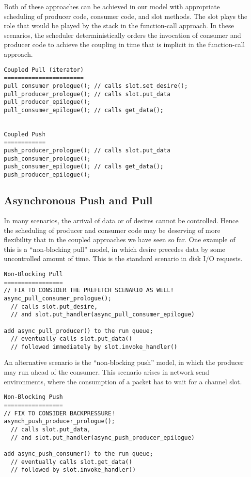 \documentclass[dvips,10pt]{article}
\begin{document}
Both of these approaches can be achieved in our model with appropriate
scheduling of producer code, consumer code, and slot methods.  The
slot plays the role that would be played by the stack in the
function-call approach.  In these scenarios, the scheduler
deterministically orders the invocation of consumer and producer code
to achieve the coupling in time that is implicit in the function-call
approach.

\begin{verbatim}
Coupled Pull (iterator)
=======================
pull_consumer_prologue(); // calls slot.set_desire();
pull_producer_prologue(); // calls slot.put_data
pull_producer_epilogue();
pull_consumer_epilogue(); // calls get_data();


Coupled Push
============
push_producer_prologue(); // calls slot.put_data
push_consumer_prologue(); 
push_consumer_epilogue(); // calls get_data();
push_producer_epilogue();
\end{verbatim}

\subsection{Asynchronous Push and Pull}
In many scenarios, the arrival of data or of desires cannot be
controlled.  Hence the scheduling of producer and consumer code may be
deserving of more flexibility that in the coupled approaches we have
seen so far.  One example of this is a ``non-blocking pull'' model, in
which desire precedes data by some uncontrolled amount of time.  This
is the standard scenario in disk I/O requests.

\begin{verbatim}
Non-Blocking Pull
=================
// FIX TO CONSIDER THE PREFETCH SCENARIO AS WELL!
async_pull_consumer_prologue(); 
  // calls slot.put_desire, 
  // and slot.put_handler(async_pull_consumer_epilogue)

add async_pull_producer() to the run queue; 
  // eventually calls slot.put_data()
  // followed immediately by slot.invoke_handler()
\end{verbatim}

An alternative scenario is the ``non-blocking push'' model, in which
the producer may run ahead of the consumer.  This scenario arises in
network send environments, where the consumption of a packet has to
wait for a channel slot.

\begin{verbatim}
Non-Blocking Push
=================
// FIX TO CONSIDER BACKPRESSURE!
asynch_push_producer_prologue();
  // calls slot.put_data, 
  // and slot.put_handler(async_push_producer_epilogue)

add async_push_consumer() to the run queue;
  // eventually calls slot.get_data()
  // followed by slot.invoke_handler()
\end{verbatim}
\end{document}
